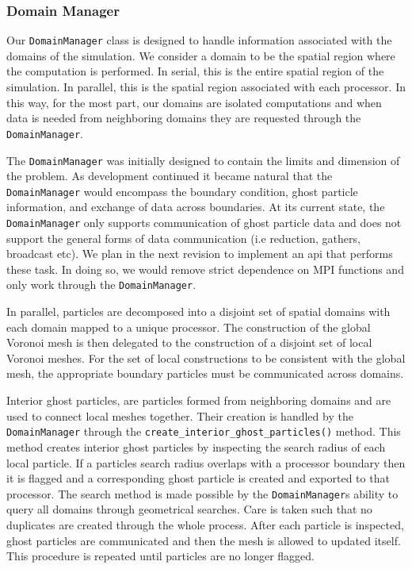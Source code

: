 \subsubsection{Domain Manager}
\label{sec.domain.manager}
Our \lstinline{DomainManager} class is designed to handle information associated with
the domains of the simulation. We consider a domain to be the spatial region where the computation
is performed. In serial, this is the entire spatial region of the simulation.
In parallel, this is the spatial region associated with each processor. 
In this way, for the most part, our domains are isolated computations and when
data is needed from neighboring domains they are requested through the \lstinline{DomainManager}.

The \lstinline{DomainManager} was initially designed to contain the limits and dimension of
the problem. As development continued it became natural that the \lstinline{DomainManager} would
encompass the boundary condition, ghost particle information, and exchange of data across boundaries.
At its current state, the \lstinline{DomainManager} only supports communication of ghost particle data
and does not support the general forms of data communication
(i.e reduction, gathers, broadcast etc). We plan in the next revision to implement an api that
performs these task. In doing so, we would remove strict dependence on MPI functions and only
work through the \lstinline{DomainManager}.

In parallel, particles are decomposed into a disjoint set of spatial domains
with each domain mapped to a unique processor. The construction
of the global Voronoi mesh is then delegated to the construction of a disjoint set
of local Voronoi meshes. For the set of local constructions to be consistent
with the global mesh, the appropriate boundary particles must be 
communicated across domains.

Interior ghost particles, are particles formed from neighboring domains and are used to
connect local meshes together. Their creation is handled by the \lstinline{DomainManager}
through the \lstinline{create_interior_ghost_particles()} method. This method
creates interior ghost particles by inspecting the search radius of
each local particle. If a particles search radius overlaps with a processor
boundary then it is flagged and a corresponding ghost particle is created and exported to that processor.
The search method is made possible by the \lstinline{DomainManager}s ability to query
all domains through geometrical searches. Care is taken such that no duplicates are created through the 
whole process. After each particle is inspected, ghost particles are communicated and then the
mesh is allowed to updated itself. This procedure is repeated until particles are no longer flagged.

